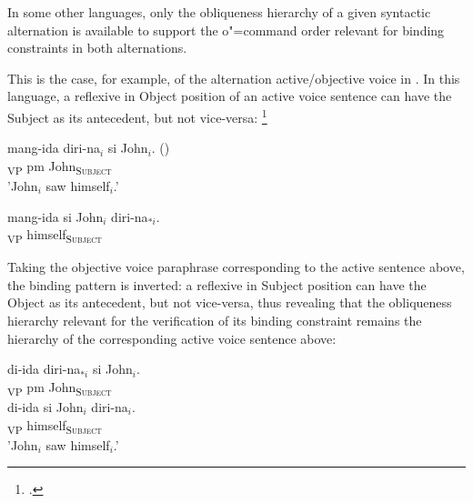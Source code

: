 \documentclass[output=paper
	        ,collection
	        ,collectionchapter
 	        ,biblatex
                ,babelshorthands
                ,newtxmath
                ,draftmode
                ,colorlinks, citecolor=brown
]{langscibook}
\begin{document}
In some other languages, only the obliqueness hierarchy of a given syntactic alternation 
is available to support
the o"=command order relevant for binding constraints in both alternations.

This is the
case, for example, of the alternation active/objective voice in . 
In this language, a reflexive in Object position of an active voice sentence
can have the Subject as its antecedent, but not vice-versa:%
%
\footnote{
\citep[]{manningSag:1999}.}


\begin{exe}
\ex
\begin{xlist}
\ex
\gll mang-ida diri-na$_{i}$ si John$_{i}$. ()\\ 
[{\sc active}-saw himself\textsubscript{\textsc{Object}}]\textsubscript{VP} {\sc pm} John\textsubscript{\textsc{Subject}} \\
\trans 'John$_{i}$ saw himself$_{i}$.'

\ex
\gll mang-ida si John$_{i}$ diri-na$_{*i}$.\\ 
[{\sc active}-saw {\sc pm} John\textsubscript{\textsc{Object}}]\textsubscript{VP} himself\textsubscript{\textsc{Subject}} \\
\end{xlist}
\end{exe}



Taking the objective voice paraphrase corresponding to the active sentence
above, the binding pattern is inverted: a reflexive in Subject position can have
the Object as its antecedent, but not vice-versa, thus revealing that
the obliqueness hierarchy relevant for the verification of its binding
constraint remains the hierarchy of the corresponding active voice
sentence above:

\begin{exe}
\ex
\begin{xlist}
\ex
\gll di-ida diri-na$_{*i}$ si John$_{i}$.\\ 
[{\sc objective}-saw himself\textsubscript{\textsc{Object}}]\textsubscript{VP} {\sc pm} John\textsubscript{\textsc{Subject}} \\

\ex
\gll di-ida si John$_{i}$ diri-na$_{i}$.\\ 
[{\sc objective}-saw {\sc pm} John\textsubscript{\textsc{Object}}]\textsubscript{VP} himself\textsubscript{\textsc{Subject}} \\
\trans 'John$_{i}$ saw himself$_{i}$.'
\end{xlist}
\end{exe}
\end{document}
